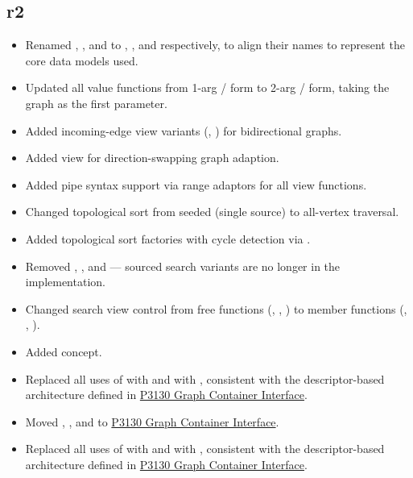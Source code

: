 \subsection*{\paperno r2}
\begin{itemize}
    \item Renamed , , and  to , 
          , and  respectively, to align their names to represent
          the core data models used.
    \item Updated all value functions from 1-arg / form to
          2-arg / form, taking the graph as the first
          parameter.
    \item Added incoming-edge view variants (,
          ) for bidirectional graphs.
    \item Added  view for direction-swapping graph adaption.
    \item Added pipe syntax support via range adaptors for all view functions.
    \item Changed topological sort from seeded (single source) to all-vertex traversal.
    \item Added  topological sort factories with cycle detection
          via .
    \item Removed , , and
           --- sourced search variants are no longer
          in the implementation.
    \item Changed search view control from free functions (, ,
          ) to member functions (, ,
          ).
    \item Added  concept.
    \item Replaced all uses of  with 
          and  with , consistent with the
          descriptor-based architecture defined in \href{https://www.wg21.link/P3130}{P3130 Graph Container Interface}.
    \item Moved , , and  to 
          \href{https://www.wg21.link/P3130}{P3130 Graph Container Interface}.
    \item Replaced all uses of  with 
          and  with , consistent with the
          descriptor-based architecture defined in \href{https://www.wg21.link/P3130}{P3130 Graph Container Interface}.
\end{itemize}
